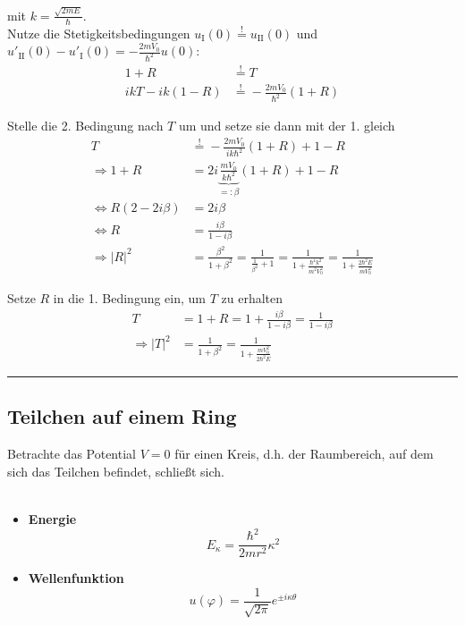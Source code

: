 \documentclass{article}
\begin{document}
{mit $k = \frac{\sqrt{2mE}}{\hbar}$.\\
Nutze die Stetigkeitsbedingungen $u_\text{I}(0) \stackrel{!}{=} u_\text{II}(0)$ und $u'_\text{II}(0) - u'_\text{I}(0) = -\frac{2mV_0}{\hbar^2}u(0)$:
	\begin{align*}
		1 + R &\stackrel{!}{=} T \\
		ikT - ik(1 - R) &\stackrel{!}{=} -\frac{2mV_0}{\hbar^2}(1 + R)
	\end{align*}

Stelle die 2. Bedingung nach $T$ um und setze sie dann mit der 1. gleich
	\begin{align*}
		T &\stackrel{!}{=} -\frac{2mV_0}{ik\hbar^2}(1 + R) + 1 - R \\
		\Rightarrow 1 + R &= 2i\underbrace{\frac{mV_0}{k\hbar^2}}_{=:\beta}(1 + R) + 1 - R \\
		\Leftrightarrow R(2 - 2i\beta) &= 2i\beta \\
		\Leftrightarrow R &= \frac{i\beta}{1 - i\beta}\\
		\Rightarrow |R|^2 &= \frac{\beta^2}{1 + \beta^2} = \frac{1}{\frac{1}{\beta^2} + 1} = \frac{1}{1 + \frac{\hbar^4 k^2}{m^2 V_0^2}} = \frac{1}{1 + \frac{2\hbar^2 E}{m V_0^2}}
	\end{align*}

Setze $R$ in die 1. Bedingung ein, um $T$ zu erhalten
	\begin{align*}
		T &= 1 + R = 1 + \frac{i\beta}{1 - i\beta} = \frac{1}{1 - i\beta} \\
		\Rightarrow |T|^2 &= \frac{1}{1 + \beta^2} = \frac{1}{1 + \frac{m V_0^2}{2\hbar^2 E}}		
	\end{align*}
\hrule
}


\newpage


\subsection{Teilchen auf einem Ring}
Betrachte das Potential $V=0$ für einen Kreis, d.h. der Raumbereich, auf dem sich das Teilchen befindet, schließt sich.\\
\\
\begin{itemize}
	\item \textbf{Energie}
		\begin{equation}
			E_\kappa = \frac{\hbar^2}{2mr^2}\kappa^2
		\end{equation}


	\item \textbf{Wellenfunktion}
		\begin{equation}
			u(\varphi) = \frac{1}{\sqrt{2\pi}} e^{\pm i \kappa \theta}
		\end{equation}
	
\end{itemize}
\end{document}
